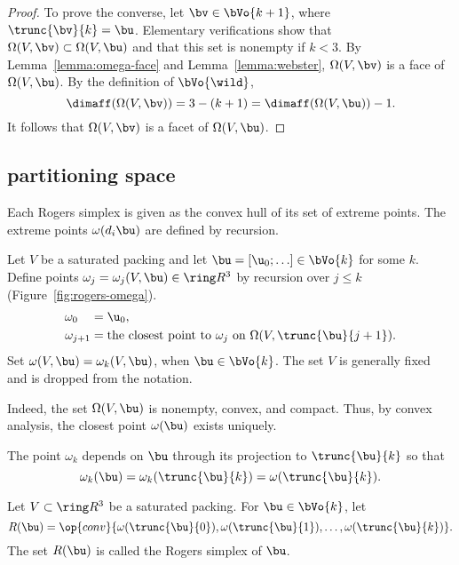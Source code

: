 \begin{cnl}
\begin{proof}
To prove the converse, let $\bv\in \bVo{k+1}$, where $\trunc{\bv}{k} =
\bu$.  Elementary verifications show that $\Omega(V,\bv)\subset
\Omega(V,\bu)$ and that this set is nonempty if $k<3$.  By
Lemma~\ref{lemma:omega-face} and Lemma~\ref{lemma:webster},
$\Omega(V,\bv)$ is a face of $\Omega(V,\bu)$.  By the definition of
$\bVo{\wild }$,
\[  
\dimaff(\Omega(V,\bv)) = 3 - (k+1) = \dimaff(\Omega(V,\bu)) -1.
\] 
It follows that $\Omega(V,\bv)$ is a facet of $\Omega(V,\bu)$.
\end{proof}


\subsection{partitioning space}\label{partitioning space}

Each Rogers simplex is given as the convex hull of  its set of extreme points.  
The extreme points $\omega(d_i\bu)$
are defined by recursion.

\begin{definition}[$\omega$]
\label{def:omega}
%
Let $V$ be a saturated packing and let $\bu=[\u_0;\ldots]\in \bVo{k}$
for some $k$.  Define points $\omega_j=\omega_j(V,\bu)\in\vecR{3}$ by
recursion over $j\le k$ (Figure~\ref{fig:rogers-omega}).
\begin{align*}
\omega_{0\phantom{+1}} &= \u_0,\\
\omega_{j+1} &=\text{the closest point to } \omega_j 
\text{ on }\Omega(V,\trunc{\bu}{j+1}).
\end{align*}
Set $\omega(V,\bu) = \omega_{k}(V,\bu)$, when $\bu\in \bVo{k}$.  The
set $V$ is generally fixed and is dropped from the notation.
\end{definition}

\figHFFTUNW %

  Indeed,
the set $\Omega(V, \bu)$ is nonempty, convex, and compact.  Thus, by
convex analysis, the closest point $\omega( \bu)$ exists uniquely.

The point $\omega_k$ depends on $\bu$ through its projection to
$\trunc{\bu}{k}$ so that
\[
\omega_k(\bu) = \omega_k(\trunc{\bu}{k})=\omega(\trunc{\bu}{k}).
\]
%


\begin{definition}
\label{def:Rogers-simplex}
%
Let $V\subset\vecR{3}$ be a saturated packing. For $\bu\in \bVo{k}$, let 
\[
 R(\bu) = \op{conv}\{\omega( \trunc{\bu}{0}), \omega(
 \trunc{\bu}{1}),\ldots,\omega( \trunc{\bu}{k})\}.
\]
The set $R(\bu)$ is called the Rogers simplex of $\bu$.
\end{definition}


\end{cnl}
